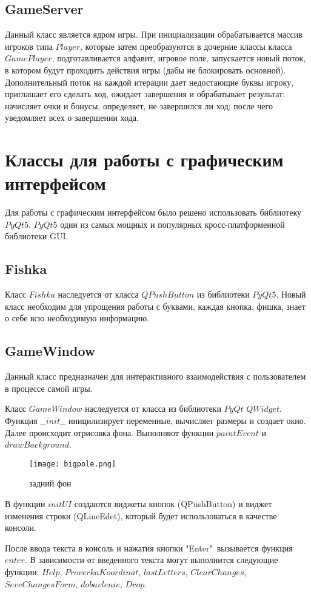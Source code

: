 \documentclass[a4paper,14pt]{article}
\begin{document}
	\subsection{GameServer}
	Данный класс является ядром игры. При инициализации обрабатывается массив игроков типа $Player$, которые затем преобразуются в дочерние классы класса $GamePlayer$, подготавливается алфавит, игровое поле, запускается новый поток, в котором будут проходить действия игры (дабы не блокировать основной). Дополнительный поток на каждой итерации дает недостающие буквы игроку, приглашает его сделать ход, ожидает завершения и обрабатывает результат: начисляет очки и бонусы, определяет, не завершился ли ход; после чего уведомляет всех о завершении хода.

	
\section{Классы для работы с графическим интерфейсом}
Для работы с графическим интерфейсом было решено использовать библиотеку $PyQt5$. $PyQt5$ один из самых мощных и популярных кросс-платформенной библиотеки GUI.
	\subsection{Fishka}
	Класс $Fishka$ наследуется от класса $QPushButton$ из библиотеки $PyQt5$. Новый класс необходим для упрощения работы с буквами, каждая кнопка, фишка, знает о себе всю необходимую информацию.
	\subsection{GameWindow}
	Данный класс предназначен для интерактивного взаимодействия с пользователем в процессе самой игры.
	
	Класс $GameWindow$ наследуется от класса из библиотеки $PyQt$ $QWidget$.	
	Функция $\_\_init\_\_$  иницилизирует переменные, вычисляет размеры и создает окно.	
	Далее происходит отрисовка фона. Выполняют функции $paintEvent$ и $drawBackground$.
	\begin{figure}[H]
		\centering
		\caption{задний фон}
		\texttt{[image: bigpole.png]}
	\end{figure}
		
	В функции $initUI$ создаются виджеты кнопок (QPushButton) и виджет изменения строки (QLineEdet), который будет использоваться в качестве консоли.
		
	После ввода текста в консоль и нажатия кнопки "Enter"\ вызывается функция $enter$.
	В зависимости от введенного текста могут выполнится следующие функции: $Help$, $ProverkaKoordinat$,  $lastLetters$,  $ClearChanges$, $SeveChangesForm$, $dobavlenie$, $Drop$.
	
\end{document}
